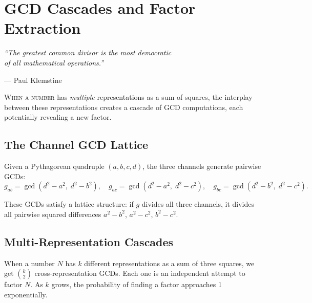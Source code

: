 \documentclass[11pt,twoside,openright]{book}
\theoremstyle{definition}
\begin{document}
\chapter{GCD Cascades and Factor Extraction}
\label{ch:gcd-cascade}

\epigraph{\itshape ``The greatest common divisor is the most democratic\\
of all mathematical operations.''}
{--- Paul Klemstine}

\lettrine[lines=3]{W}{hen a number} has \emph{multiple} representations
as a sum of squares, the interplay between these representations creates
a cascade of GCD computations, each potentially revealing a new factor.

\section{The Channel GCD Lattice}

Given a Pythagorean quadruple $(a,b,c,d)$, the three channels generate
pairwise GCDs:
\[
g_{ab} = \gcd(d^2-a^2,\; d^2-b^2),\quad
g_{ac} = \gcd(d^2-a^2,\; d^2-c^2),\quad
g_{bc} = \gcd(d^2-b^2,\; d^2-c^2).
\]

These GCDs satisfy a lattice structure: if $g$ divides all three channels,
it divides all pairwise squared differences $a^2-b^2$, $a^2-c^2$, $b^2-c^2$.

\section{Multi-Representation Cascades}

When a number $N$ has $k$ different representations as a sum of three
squares, we get $\binom{k}{2}$ cross-representation GCDs. Each one is
an independent attempt to factor $N$. As $k$ grows, the probability of
finding a factor approaches 1 exponentially.
\end{document}
